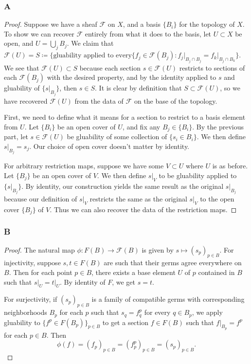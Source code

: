 \documentclass{article}
\newcommand{\fF}{\mathscr{F}}
\begin{document}
\subsubsection{A}\label{2.5.A}
\begin{proof}
    Suppose we have a sheaf $\fF$ on $X$, and a basis $\{B_i\}$ for the topology of $X$. To show we can recover $\fF$ entirely from what it does to the basis, let $U\subset X$ be open, and $U=\bigcup_j B_j$. We claim that $\fF(U)=S\coloneqq \{\text{gluability applied to every} \{f_j\in \fF(B_j) : f_j\vert_{B_j\cap B_j}=f_k\vert_{B_j\cap B_k}\}$. We see that $\fF(U)\subset S$ because each section $s\in \fF(U)$ restricts to sections of each $\fF(B_j)$ with the desired property, and by the identity applied to $s$ and gluability of $\{s\vert_{B_j}\}$, then $s\in S$. It is clear by definition that $S\subset \fF(U)$, so we have recovered $\fF(U)$ from the data of $\fF$ on the base of the topology.
    
    \vspace{0.1in}
    First, we need to define what it means for a section to restrict to a basis element from $U$. Let $\{B_i\}$ be an open cover of $U$, and fix any $B_j\in \{B_i\}$. By the previous part, let $s\in \fF(U)$ be gluability of some collection of $\{s_i\in B_i\}$. We then define $s\vert_{B_j}=s_j$. Our choice of open cover doesn't matter by identity.

    \vspace{0.1in}
    For arbitrary restriction maps, suppose we have some $V\subset U$ where $U$ is as before. Let $\{B_j\}$ be an open cover of $V$. We then define $s\vert_V$ to be gluability applied to $\{s\vert_{B_j}\}$. By identity, our construction yields the same result as the original $s\vert_{B_j}$ because our definition of $s\vert_V$ restricts the same as the original $s\vert_V$ to the open cover $\{B_j\}$ of $V$. Thus we can also recover the data of the restriction maps.
\end{proof}
\subsubsection{B}\label{2.5.B}
\begin{proof}
    The natural map $\phi:F(B)\to \fF(B)$ is given by $s\mapsto (s_p)_{p\in B}$. For injectivity, suppose $s,t\in F(B)$ are such that their germs agree everywhere on $B$. Then for each point $p\in B$, there exists a base element $U$ of $p$ contained in $B$ such that $s\vert_U=t\vert_U$. By identity of $F$, we get $s=t$.

    \vspace{0.1in}
    For surjectivity, if $(s_p)_{p\in B}$ is a family of compatible germs with corresponding neighborhoods $B_p$ for each $p$ such that $s_q=f^p_q$ for every $q\in B_p$, we apply gluability to $\{f^p\in F(B_p)\}_{p\in B}$ to get a section $f\in F(B)$ such that $f\vert_{B_p}=f^p$ for each $p\in B$. Then
    \[
    \phi(f)=(f_p)_{p\in B}=(f^p_p)_{p\in B}=(s_p)_{p\in B}.
    \]
\end{proof}
\end{document}
